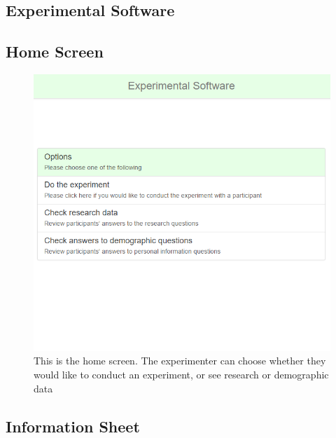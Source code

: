 \documentclass{l4proj}
\begin{document}
\begin{appendices}

\chapter{Experimental Software}

\section{Home Screen}

\begin{figure}[H]
\centering
\includegraphics[width=14cm]{images/home.PNG}
\caption{This is the home screen. The experimenter can choose whether they would like to conduct an experiment, or see research or demographic data}
\label{homeScreen}
\end{figure}

\section{Information Sheet}


\end{appendices}
\end{document}
